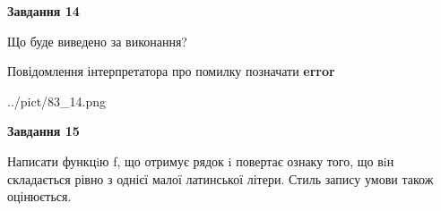\documentclass[11pt, ukrainian]{article}
\begin{document}
{\begin {large}
{\begin {center}\textbf{Завдання 14}\end {center}}\par
Що буде виведено за виконання? \par
Повідомлення інтерпретатора про помилку позначати \textbf{error}

\begin{center}
	{../pict/83_14.png}
\end{center}
\newpage

{\begin {center}\textbf{Завдання 15}\end {center}}\par

Написати функцiю f, що отримує рядок i повертає ознаку того, що вiн складається рівно з однієї малої латинської літери. Стиль запису умови також оцінюється.\par
\newpage

\end {large}}
\end{document}
